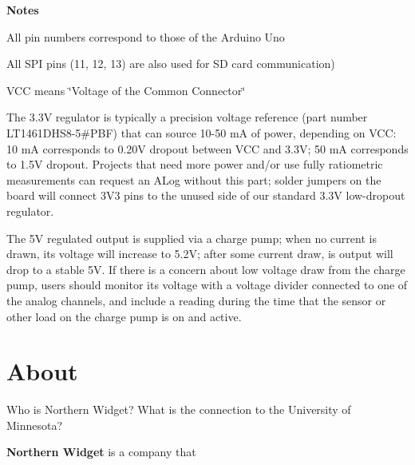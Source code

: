 {\bfseries Notes} 
\begin{DoxyEnumerate}
\item All pin numbers correspond to those of the Arduino Uno
\item All S\+PI pins (11, 12, 13) are also used for SD card communication)
\item V\+CC means \char`\"{}\+Voltage of the Common Connector\char`\"{}
\item The 3.\+3V regulator is typically a precision voltage reference (part number L\+T1461\+D\+H\+S8-\/5\#\+P\+BF) that can source 10-\/50 mA of power, depending on V\+CC\+: 10 mA corresponds to 0.\+20V dropout between V\+CC and 3.\+3V; 50 mA corresponds to 1.\+5V dropout. Projects that need more power and/or use fully ratiometric measurements can request an A\+Log without this part; solder jumpers on the board will connect 3\+V3 pins to the unused side of our standard 3.\+3V low-\/dropout regulator.
\item The 5V regulated output is supplied via a charge pump; when no current is drawn, its voltage will increase to 5.\+2V; after some current draw, is output will drop to a stable 5V. If there is a concern about low voltage draw from the charge pump, users should monitor its voltage with a voltage divider connected to one of the analog channels, and include a reading during the time that the sensor or other load on the charge pump is on and active.
\end{DoxyEnumerate}\hypertarget{index_About}{}\section{About}\label{index_About}
Who is Northern Widget? What is the connection to the University of Minnesota?

{\bfseries Northern Widget} is a company that 